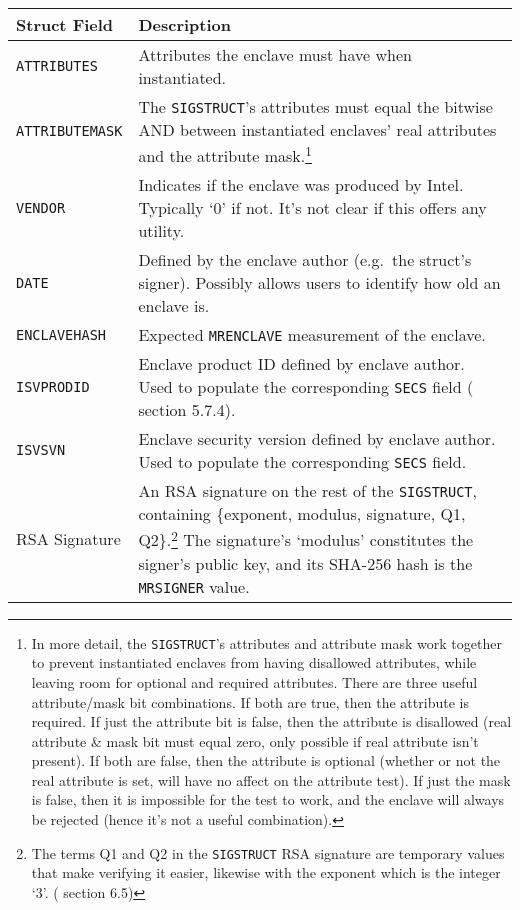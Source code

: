 \begin{tabularx}{\textwidth}{|l|X|}
\caption{{\tt SIGSTRUCT} Contents}
\label{table:sgx-sigstruct}\\
\hline
    Struct Field & Description \\
\hline\hline
    {\tt ATTRIBUTES} & Attributes the enclave must have when instantiated. \\
\hline
    {\tt ATTRIBUTEMASK} & The {\tt SIGSTRUCT}'s attributes must equal the bitwise AND between instantiated enclaves' real attributes and the attribute mask.\footnote{In more detail, the {\tt SIGSTRUCT}'s attributes and attribute mask work together to prevent instantiated enclaves from having disallowed attributes, while leaving room for optional and required attributes. There are three useful attribute/mask bit combinations. If both are true, then the attribute is required. If just the attribute bit is false, then the attribute is disallowed (real attribute \& mask bit must equal zero, only possible if real attribute isn't present). If both are false, then the attribute is optional (whether or not the real attribute is set, will have no affect on the attribute test). If just the mask is false, then it is impossible for the test to work, and the enclave will always be rejected (hence it's not a useful combination).} \\
\hline
    {\tt VENDOR} & Indicates if the enclave was produced by Intel. Typically `0' if not. It's not clear if this offers any utility. \\
\hline
    {\tt DATE} & Defined by the enclave author (e.g.\ the struct's signer). Possibly allows users to identify how old an enclave is. \\
\hline
    {\tt ENCLAVEHASH} & Expected {\tt MRENCLAVE} measurement of the enclave. \\
\hline
    {\tt ISVPRODID} & Enclave product ID defined by enclave author. Used to populate the corresponding {\tt SECS} field (\cite{intel-sgx-explained-advanced} section 5.7.4). \\
\hline
    {\tt ISVSVN} & Enclave security version defined by enclave author. Used to populate the corresponding {\tt SECS} field. \\
\hline
    RSA Signature & An RSA signature on the rest of the {\tt SIGSTRUCT}, containing \{exponent, modulus, signature, Q1, Q2\}.\footnote{The terms Q1 and Q2 in the {\tt SIGSTRUCT} RSA signature are temporary values that make verifying it easier, likewise with the exponent which is the integer `3'. (\cite{intel-sgx-explained-advanced} section 6.5)} The signature's `modulus' constitutes the signer's public key, and its SHA-256 hash is the {\tt MRSIGNER} value. \\
\hline
\end{tabularx}

